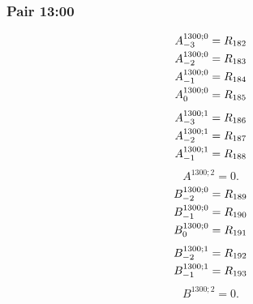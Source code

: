 \documentclass[11pt,a4paper]{article}
\begin{document}
\subsubsection{Pair 13:00}
\begin{equation}
\shortstack[l]{$\displaystyle A^{1300;0}_{-3}=R_{182}$\\
$\displaystyle A^{1300;0}_{-2}=R_{183}$\\
$\displaystyle A^{1300;0}_{-1}=R_{184}$\\
$\displaystyle A^{1300;0}_{0}=R_{185}$}
\label{eq:cat-map-324}
\end{equation}
\begin{equation}
\shortstack[l]{$\displaystyle A^{1300;1}_{-3}=R_{186}$\\
$\displaystyle A^{1300;1}_{-2}=R_{187}$\\
$\displaystyle A^{1300;1}_{-1}=R_{188}$}
\label{eq:cat-map-325}
\end{equation}
\begin{equation}
A^{1300;2}=0.
\label{eq:cat-map-326}
\end{equation}
\begin{equation}
\shortstack[l]{$\displaystyle B^{1300;0}_{-2}=R_{189}$\\
$\displaystyle B^{1300;0}_{-1}=R_{190}$\\
$\displaystyle B^{1300;0}_{0}=R_{191}$}
\label{eq:cat-map-327}
\end{equation}
\begin{equation}
\shortstack[l]{$\displaystyle B^{1300;1}_{-2}=R_{192}$\\
$\displaystyle B^{1300;1}_{-1}=R_{193}$}
\label{eq:cat-map-328}
\end{equation}
\begin{equation}
B^{1300;2}=0.
\label{eq:cat-map-329}
\end{equation}
\end{document}
